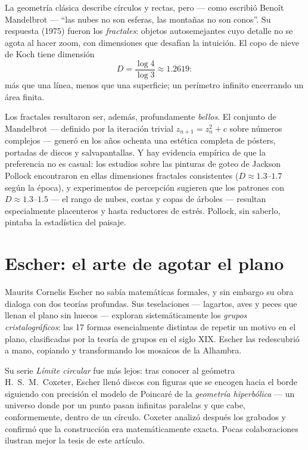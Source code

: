 \documentclass[11pt]{article}
\begin{document}
La geometría clásica describe círculos y rectas, pero --- como escribió Benoît Mandelbrot ---
``las nubes no son esferas, las montañas no son conos''. Su respuesta (1975) fueron los
\emph{fractales}: objetos autosemejantes cuyo detalle no se agota al hacer zoom, con
dimensiones que desafían la intuición. El copo de nieve de Koch tiene dimensión
\[
D = \frac{\log 4}{\log 3} \approx 1.2619:
\]
más que una línea, menos que una superficie; un perímetro infinito encerrando un área finita.

Los fractales resultaron ser, además, profundamente \emph{bellos}. El conjunto de Mandelbrot
--- definido por la iteración trivial $z_{n+1} = z_n^2 + c$ sobre números complejos --- generó
en los años ochenta una estética completa de pósters, portadas de discos y salvapantallas.
Y hay evidencia empírica de que la preferencia no es casual: los estudios sobre las pinturas
de goteo de Jackson Pollock encontraron en ellas dimensiones fractales consistentes
($D \approx 1.3$--$1.7$ según la época), y experimentos de percepción sugieren que los
patrones con $D \approx 1.3$--$1.5$ --- el rango de nubes, costas y copas de árboles ---
resultan especialmente placenteros y hasta reductores de estrés. Pollock, sin saberlo,
pintaba la estadística del paisaje.

\section{Escher: el arte de agotar el plano}

Maurits Cornelis Escher no sabía matemáticas formales, y sin embargo su obra dialoga con dos
teorías profundas. Sus teselaciones --- lagartos, aves y peces que llenan el plano sin huecos
--- exploran sistemáticamente los \emph{grupos cristalográficos}: las 17 formas esencialmente
distintas de repetir un motivo en el plano, clasificadas por la teoría de grupos en el siglo
XIX. Escher las redescubrió a mano, copiando y transformando los mosaicos de la Alhambra.

Su serie \emph{Límite circular} fue más lejos: tras conocer al geómetra H.~S.~M.~Coxeter,
Escher llenó discos con figuras que se encogen hacia el borde siguiendo con precisión el
modelo de Poincaré de la \emph{geometría hiperbólica} --- un universo donde por un punto pasan
infinitas paralelas y que cabe, conformemente, dentro de un círculo. Coxeter analizó después
los grabados y confirmó que la construcción era matemáticamente exacta. Pocas colaboraciones
ilustran mejor la tesis de este artículo.
\end{document}
